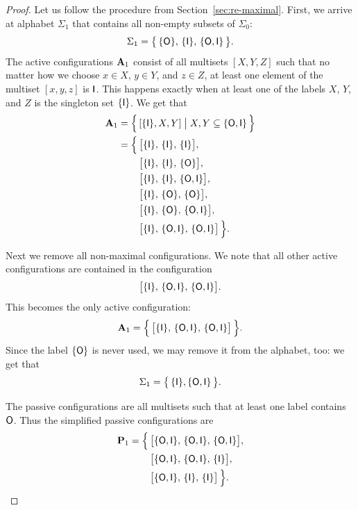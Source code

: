 \begin{proof}
	Let us follow the procedure from Section~\ref{sec:re-maximal}. First, we arrive at alphabet $\Sigma_1$ that contains all non-empty subsets of $\Sigma_0$: 
	\[
		\Sigma_1 = \bigl\{\, \{\mathsf{O}\},\,\{\mathsf{I}\},\,\{\mathsf{O},\mathsf{I}\} \,\bigr\}.
	\]
	The active configurations $\mathbf{A}_1$ consist of all multisets $[X, Y, Z]$ such that no matter how we choose $x \in X$, $y \in Y$, and $z \in Z$, at least one element of the multiset $[x,y,z]$ is $\mathsf{I}$. This happens exactly when at least one of the labels $X$, $Y$, and $Z$ is the singleton set $\{ \mathsf{I} \}$. We get that 
	\begin{align*}
		\mathbf{A}_1 = \Bigl\{\, & [ \{ \mathsf{I} \}, X, Y ] \bigm| X,Y \subseteq \{ \mathsf{O}, \mathsf{I} \} \, \Bigr\} \\
		= \Bigl\{\,
		&\bigl[\{ \mathsf{I} \},\, \{\mathsf{I} \},\, \{ \mathsf{I} \}\bigr],\\
		&\bigl[\{\mathsf{I}\},\, \{\mathsf{I}\},\, \{ \mathsf{O} \}\bigr],\\
		&\bigl[\{\mathsf{I}\},\,\{\mathsf{I}\},\,\{\mathsf{O},\mathsf{I}\} \bigr],\\
		&\bigl[\{ \mathsf{I} \},\, \{\mathsf{O} \},\,\{ \mathsf{O} \}\bigr],\\
		&\bigl[\{ \mathsf{I} \},\, \{\mathsf{O} \},\,\{ \mathsf{O}, \mathsf{I} \}\bigr], \\
		&\bigl[\{\mathsf{I}\},\, \{ \mathsf{O}, \mathsf{I} \},\, \{ \mathsf{O}, \mathsf{I} \}\bigr] \, \Bigr\}.
	\end{align*}
	
	Next we remove all non-maximal configurations. We note that all other active configurations are contained in the configuration 
	\[
	\bigl[\{ \mathsf{I} \},\, \{ \mathsf{O}, \mathsf{I} \},\, \{ \mathsf{O}, \mathsf{I} \} \bigr].
	\]
	This becomes the only active configuration: 
	\[
		\mathbf{A}_1 = \Bigl\{ \, \bigl[\{ \mathsf{I} \},\, \{ \mathsf{O}, \mathsf{I} \},\, \{ \mathsf{O}, \mathsf{I} \} \bigr] \, \Bigr\}.
	\]
	Since the label $\{ \mathsf{O} \}$ is never used, we may remove it from the alphabet, too: we get that
	\[
		\Sigma_1 = \bigl\{\, \{\mathsf{I}\}, \{\mathsf{O}, \mathsf{I} \} \,\bigr\}.
	\]
	
	The passive configurations are all multisets such that at least one label contains $\mathsf{O}$. Thus the simplified passive configurations are
	\begin{align*}
		\mathbf{P}_1 = \Bigl\{\,
		&\bigl[\{ \mathsf{O}, \mathsf{I} \},\, \{ \mathsf{O}, \mathsf{I} \},\, \{ \mathsf{O}, \mathsf{I} \}\bigr],\\
		&\bigl[\{ \mathsf{O}, \mathsf{I} \},\, \{ \mathsf{O}, \mathsf{I} \},\,\{ \mathsf{I} \}\bigr],\\
		&\bigl[\{ \mathsf{O}, \mathsf{I} \},\,\{\mathsf{I}\},\,\{\mathsf{I}\}\bigr] \, \Bigr\}. \qedhere
	\end{align*}
\end{proof}

